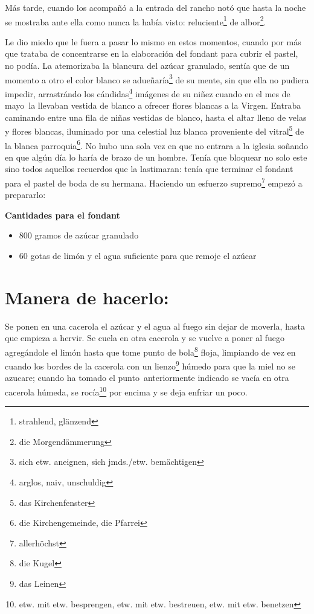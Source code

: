 Más tarde, cuando los acompañó a la entrada del rancho notó que hasta la
noche se mostraba ante ella como nunca la había visto: reluciente\footnote{strahlend, glänzend}
de albor\footnote{die Morgendämmerung}.

Le dio miedo que le fuera a pasar lo mismo en estos momentos, cuando
por más que trataba de concentrarse en la elaboración del fondant para
cubrir el pastel, no podía. La atemorizaba la blancura del azúcar
granulado, sentía que de un momento a otro el color blanco
se adueñaría\footnote{sich etw. aneignen, sich jmds./etw. bemächtigen}
de su mente, sin que ella no pudiera impedir, arrastrándo los cándidas\footnote{arglos, naiv, unschuldig}
imágenes de su niñez cuando en el mes de mayo~la llevaban vestida
de blanco a ofrecer flores blancas a la Virgen. Entraba caminando entre
una fila de niñas vestidas de blanco, hasta el altar lleno de velas y
flores blancas, iluminado por una celestial luz blanca proveniente del vitral\footnote{das Kirchenfenster} de la blanca parroquia\footnote{die Kirchengemeinde, die Pfarrei}.
No hubo una sola vez en que no entrara a la iglesia soñando en que algún
día lo haría de brazo de un hombre. Tenía que bloquear no solo este sino
todos aquellos recuerdos que la lastimaran: tenía que terminar el fondant
para el pastel de boda de su hermana. Haciendo un esfuerzo supremo\footnote{allerhöchst}
empezó a prepararlo:

\textbf{Cantidades para el fondant}

\begin{itemize}
    \item 800 gramos de azúcar granulado
    \item 60 gotas de limón y el agua suficiente para que remoje el azúcar
\end{itemize}

\section*{ Manera de hacerlo: }
Se ponen en una cacerola el azúcar y el agua al fuego sin dejar de
moverla, hasta que empieza a hervir. Se cuela en otra cacerola y se
vuelve a poner al fuego agregándole el limón hasta que tome punto de bola\footnote{die Kugel} floja,
limpiando de vez en cuando los bordes de la cacerola con un lienzo\footnote{das Leinen} húmedo para que la miel no se azucare;
cuando ha tomado el punto~anteriormente indicado se vacía en otra
cacerola húmeda, se rocía\footnote{etw. mit etw. besprengen, etw. mit etw. bestreuen, etw. mit etw. benetzen}
por encima y se deja enfriar un poco.


